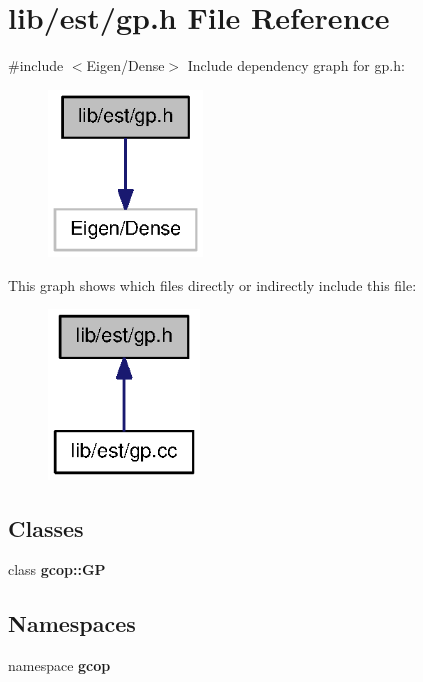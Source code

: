 \section{lib/est/gp.h \-File \-Reference}
\label{gp_8h}
{\ttfamily \#include $<$\-Eigen/\-Dense$>$}\*
\-Include dependency graph for gp.\-h\-:
\nopagebreak
\begin{figure}[H]
\begin{center}
\leavevmode
\includegraphics[width=116pt]{gp_8h__incl}
\end{center}
\end{figure}
\-This graph shows which files directly or indirectly include this file\-:
\nopagebreak
\begin{figure}[H]
\begin{center}
\leavevmode
\includegraphics[width=114pt]{gp_8h__dep__incl}
\end{center}
\end{figure}
\subsection*{\-Classes}
\begin{DoxyCompactItemize}
\item 
class {\bf gcop\-::\-G\-P}
\end{DoxyCompactItemize}
\subsection*{\-Namespaces}
\begin{DoxyCompactItemize}
\item 
namespace {\bf gcop}
\end{DoxyCompactItemize}
